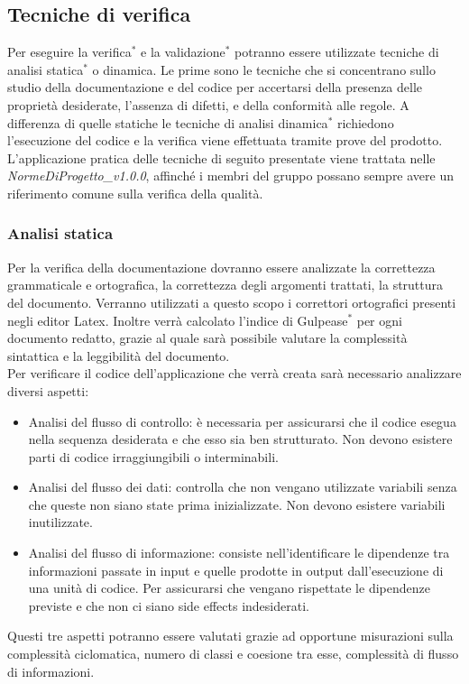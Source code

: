 \subsection{Tecniche di verifica}
Per eseguire la verifica$^*$ e la validazione$^*$ potranno essere utilizzate tecniche di analisi statica$^*$ o dinamica. Le prime sono le tecniche che si concentrano sullo studio della documentazione e del codice per accertarsi della presenza delle proprietà desiderate, l'assenza di difetti, e della conformità alle regole. A differenza di quelle statiche le tecniche di analisi dinamica$^*$ richiedono l'esecuzione del codice e la verifica viene effettuata tramite prove del prodotto.\\
L'applicazione pratica delle tecniche di seguito presentate viene trattata nelle \textit{NormeDiProgetto\_v1.0.0}, affinché i membri del gruppo possano sempre avere un riferimento comune sulla verifica della qualità.
\subsubsection{Analisi statica}
Per la verifica della documentazione dovranno essere analizzate la correttezza grammaticale e ortografica, la correttezza degli argomenti trattati, la struttura del documento. Verranno utilizzati a questo scopo i correttori ortografici presenti negli editor Latex. Inoltre verrà calcolato l'indice di Gulpease$^*$ per ogni documento redatto, grazie al quale sarà possibile valutare la complessità sintattica e la leggibilità del documento.\\
Per verificare il codice dell'applicazione che verrà creata sarà necessario analizzare diversi aspetti:
\begin{itemize}
\item Analisi del flusso di controllo: è necessaria per assicurarsi che il codice esegua nella sequenza desiderata e che esso sia ben strutturato. Non devono esistere parti di codice irraggiungibili o interminabili.
\item Analisi del flusso dei dati: controlla che non vengano utilizzate variabili senza che queste non siano state prima inizializzate. Non devono esistere variabili inutilizzate. 
\item Analisi del flusso di informazione: consiste nell'identificare le dipendenze tra informazioni passate in input e quelle prodotte in output dall’esecuzione di una unità di codice. Per assicurarsi che vengano rispettate le dipendenze previste e che non ci siano side effects indesiderati.
\end{itemize}
Questi tre aspetti potranno essere valutati grazie ad opportune misurazioni sulla complessità ciclomatica, numero di classi e coesione tra esse, complessità di flusso di informazioni.
\newpage
